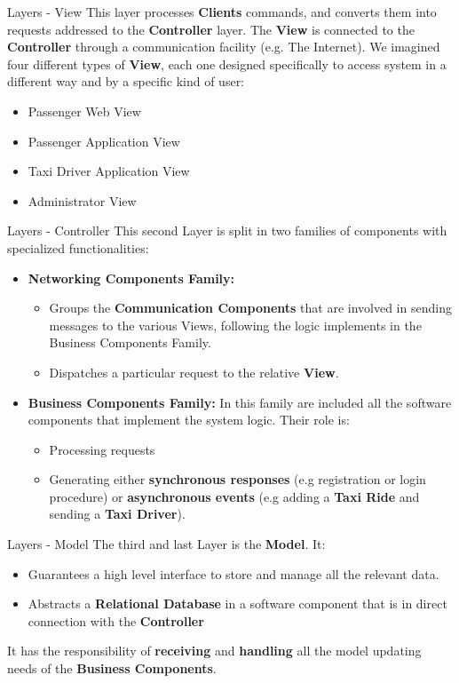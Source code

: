 \documentclass{../common/latex_classes/pdf_presentation}
\begin{document}
	\begin{frame}{Layers - View}
		This layer processes \textbf{Clients} commands, and converts them into requests addressed to the \textbf{Controller} layer.
		The \textbf{View} is connected to the \textbf{Controller} through a communication facility (e.g. The Internet).
		We imagined four different types of \textbf{View}, each one designed specifically to access \myTaxiService{} system in a different way and by a specific kind of user:
		\begin{itemize}
			\item Passenger Web View
			\item Passenger Application View
			\item Taxi Driver Application View
			\item Administrator View
		\end{itemize}
	\end{frame}
	\begin{frame}{Layers - Controller}
		This second Layer is split in two families of components with specialized functionalities:
		\begin{itemize}
			\item \textbf{Networking Components Family:}
			\begin{itemize}
				\item Groups the \textbf{Communication Components} that are involved in sending messages to the various Views, following the logic implements in the Business Components Family. 
				\item Dispatches a particular request to the relative \textbf{View}.
			\end{itemize}
			\item \textbf{Business Components Family:} In this family are included all the software components that implement the system logic.
			Their role is:
			\begin{itemize}
				\item Processing requests 
				\item Generating either \textbf{synchronous responses} (e.g registration or login procedure) or \textbf{asynchronous events} (e.g adding a \textbf{Taxi Ride} and sending a \textbf{Taxi Driver}).
			\end{itemize}
		\end{itemize}
	\end{frame}
	\begin{frame}{Layers - Model}
		The third and last Layer is the \textbf{Model}. It:
		\begin{itemize}
			\item Guarantees a high level interface to store and manage all the \myTaxiService{} relevant data.
			\item Abstracts a \textbf{Relational Database} in a software component that is in direct connection with the \textbf{Controller}
		\end{itemize}
		It has the responsibility of \textbf{receiving} and \textbf{handling} all the model updating needs of the \textbf{Business Components}. 
	\end{frame}
\end{document}
